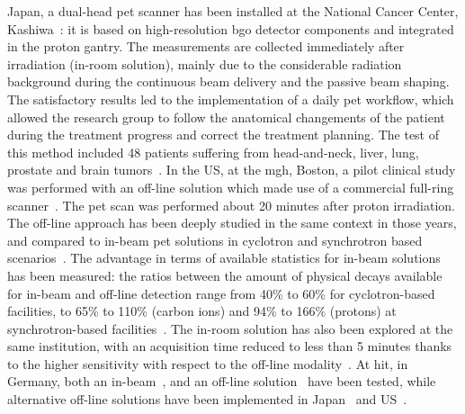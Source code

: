 Japan, a dual-head \gls{pet} scanner has been installed at the National Cancer Center, Kashiwa~\parencite{Nishio2006}: it is based on high-resolution \gls{bgo} detector components and integrated in the proton gantry. The measurements are collected immediately after irradiation (in-room solution), mainly due to the considerable radiation background during the continuous beam delivery and the passive beam shaping. The satisfactory results led to the implementation of a daily \gls{pet} workflow, which allowed the research group to follow the anatomical changements of the patient during the treatment progress and correct the treatment planning. The test of this method included 48 patients suffering from head-and-neck, liver, lung, prostate and brain tumors~\parencite{Nishio2010}. In the US, at the \gls{mgh}, Boston, a pilot clinical study was performed with an off-line solution which made use of a commercial full-ring scanner~\parencite{Parodi2007}. The \gls{pet} scan was performed about 20 minutes after proton irradiation. The off-line approach has been deeply studied in the same context in those years, and compared to in-beam \gls{pet} solutions in cyclotron and synchrotron based scenarios~\parencite{Parodi2008, Knopf2011}. The advantage in terms of available statistics for in-beam solutions has been measured: the ratios between the amount of physical decays available for in-beam and off-line detection range from 40\% to 60\% for cyclotron-based facilities, to 65\% to 110\% (carbon ions) and 94\% to 166\% (protons) at synchrotron-based facilities~\parencite{Parodi2008}. The in-room solution has also been explored at the same institution, with an acquisition time reduced to less than 5 minutes thanks to the higher sensitivity with respect to the off-line modality~\parencite{Zhu2011}.  
At \gls{hit}, in Germany, both an in-beam~\parencite{Sommerer2009}, and an off-line solution~\parencite{Bauer2013} have been tested, while alternative off-line solutions have been implemented in Japan~\parencite{Hishikawa2002} and US~\parencite{Hsi2009}. 
